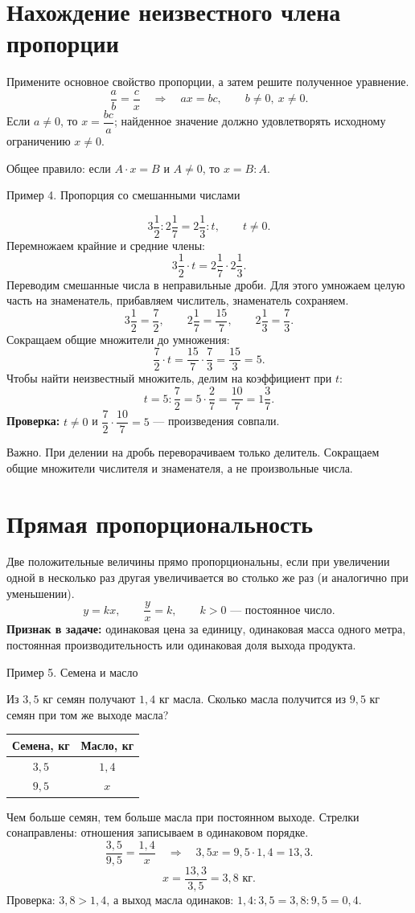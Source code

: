 \documentclass[a4paper,12pt]{article}
\newcommand{\ex}[1]{\par\medskip\textcolor{darkaccent}{#1}\par\smallskip}
\newcommand{\mix}[3]{#1\frac{#2}{#3}}
\begin{document}
\clearpage
\section{Нахождение неизвестного члена пропорции}
Примените основное свойство пропорции, а затем решите полученное уравнение.
\[
\frac{a}{b}=\frac{c}{x}\quad\Longrightarrow\quad ax=bc,
\qquad b\ne0,\ x\ne0.
\]
Если $a\ne0$, то $x=\dfrac{bc}{a}$; найденное значение должно удовлетворять исходному ограничению $x\ne0$.

Общее правило: если $A\cdot x=B$ и $A\ne0$, то $x=B:A$.
\ex{Пример 4. Пропорция со смешанными числами}
\[
\mix{3}{1}{2}:\mix{2}{1}{7}=\mix{2}{1}{3}:t,\qquad t\ne0.
\]
Перемножаем крайние и средние члены:
\[
\mix{3}{1}{2}\cdot t=\mix{2}{1}{7}\cdot\mix{2}{1}{3}.
\]
Переводим смешанные числа в неправильные дроби. Для этого умножаем целую часть на знаменатель, прибавляем числитель, знаменатель сохраняем.
\[
\mix{3}{1}{2}=\frac72,\qquad \mix{2}{1}{7}=\frac{15}{7},\qquad \mix{2}{1}{3}=\frac73.
\]
Сокращаем общие множители до умножения:
\[
\frac72\cdot t=\frac{15}{7}\cdot\frac73=\frac{15}{3}=5.
\]
Чтобы найти неизвестный множитель, делим на коэффициент при $t$:
\[
t=5:\frac72=5\cdot\frac27=\frac{10}{7}=\mix{1}{3}{7}.
\]
\textbf{Проверка:} $t\ne0$ и $\dfrac72\cdot\dfrac{10}{7}=5$ --- произведения совпали.

\textcolor{darkaccent}{Важно.} При делении на дробь переворачиваем только делитель. Сокращаем общие множители числителя и знаменателя, а не произвольные числа.

\clearpage
\section{Прямая пропорциональность}
Две положительные величины прямо пропорциональны, если при увеличении одной в несколько раз другая увеличивается во столько же раз (и аналогично при уменьшении).
\[
y=kx,\qquad \frac{y}{x}=k,\qquad k>0\text{ --- постоянное число}.
\]
\textbf{Признак в задаче:} одинаковая цена за единицу, одинаковая масса одного метра, постоянная производительность или одинаковая доля выхода продукта.

\ex{Пример 5. Семена и масло}
Из $3,5$ кг семян получают $1,4$ кг масла. Сколько масла получится из $9,5$ кг семян при том же выходе масла?
\begin{center}
\begin{tabular}{cc}
\toprule
Семена, кг & Масло, кг\\\midrule
$3,5$ & $1,4$\\
$9,5$ & $x$\\\bottomrule
\end{tabular}
\qquad
{}
\end{center}
Чем больше семян, тем больше масла при постоянном выходе. Стрелки сонаправлены: отношения записываем в одинаковом порядке.
\[
\frac{3,5}{9,5}=\frac{1,4}{x}
\quad\Longrightarrow\quad 3,5x=9,5\cdot1,4=13,3.
\]
\[
x=\frac{13,3}{3,5}=3,8\text{ кг}.
\]
Проверка: $3,8>1,4$, а выход масла одинаков: $1,4:3,5=3,8:9,5=0,4$.
\end{document}
